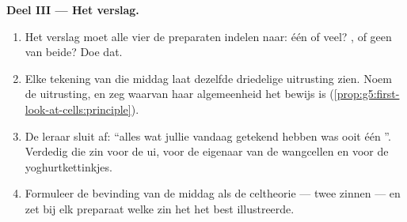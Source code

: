 \begin{problem}
\medskip\noindent\textbf{Deel III --- Het verslag.}
\begin{enumerate}[resume]
  \item Het verslag moet alle vier de preparaten indelen naar: één  of
        veel? ,  of geen van beide? Doe dat.
  \item Elke tekening van die middag laat dezelfde driedelige uitrusting
        zien. Noem de uitrusting, en zeg waarvan haar algemeenheid het
        bewijs is
        (\cref{prop:g5:first-look-at-cells:principle}).
  \item De leraar sluit af: ``alles wat jullie vandaag getekend hebben
        was ooit één ''. Verdedig die zin voor de ui, voor de eigenaar
        van de wangcellen en voor de yoghurtkettinkjes.
  \item Formuleer de bevinding van de middag als de celtheorie --- twee
        zinnen --- en zet bij elk preparaat welke zin het het best
        illustreerde.
\end{enumerate}
\end{problem}
